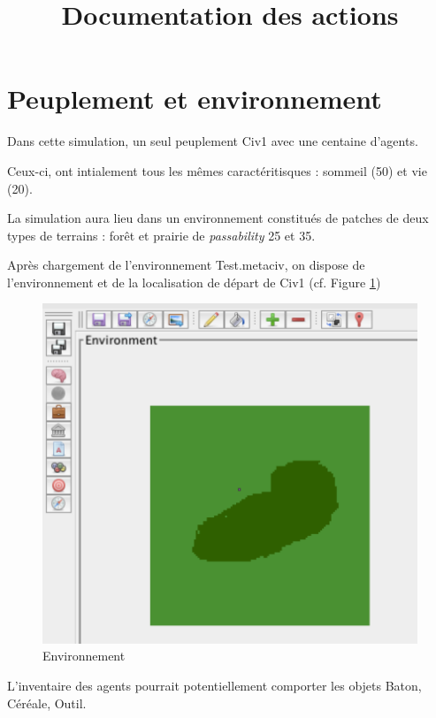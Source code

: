 \documentclass[a4paper,oneside,12 pt]{article}
\title{Documentation des actions }
\begin{document}
\maketitle

\section{Peuplement et environnement}
Dans cette simulation, un seul peuplement Civ1 avec une centaine d'agents.

Ceux-ci, ont intialement tous les mêmes caractéritisques : sommeil (50) et vie (20).

La simulation aura lieu dans un environnement constitués de patches de deux types de  terrains : forêt et prairie de \textit{passability} 25 et 35.

Après chargement de l'environnement Test.metaciv, on dispose de l'environnement et de la localisation de départ de Civ1 (cf. Figure \ref{loca})
\begin{figure}[!ht]
\begin{center}
\includegraphics[scale=0.5]{locas1.pdf}
\caption[loca]{Environnement \\}
\label{loca}
\end{center}
\end{figure} 

L'inventaire des agents pourrait potentiellement comporter les objets Baton, Céréale, Outil.
\end{document}
